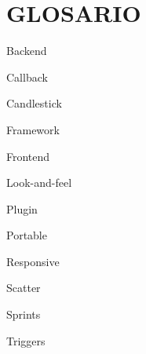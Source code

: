 \chapter*{GLOSARIO}

\begin{description}
    \item Backend
    \item Callback
    \item Candlestick
    \item Framework
    \item Frontend
    \item Look-and-feel
    \item Plugin
    \item Portable
    \item Responsive
    \item Scatter
    \item Sprints
    \item Triggers
\end{description}

\clearpage
